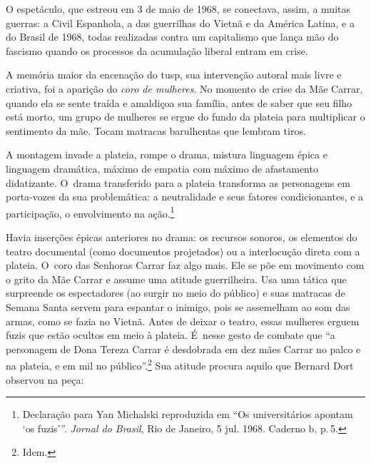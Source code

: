 O espetáculo, que estreou em 3 de maio de 1968, se conectava, assim, a muitas
guerras: a Civil Espanhola, a das guerrilhas do Vietnã e da América
Latina, e a do Brasil de 1968, todas realizadas contra um capitalismo
que lança mão do fascismo quando os processos da acumulação liberal
entram em crise.

\page

\subject{Coro das mulheres em armas}

A memória maior da encenação do {\sc tusp}, sua intervenção autoral mais livre
e criativa, foi a aparição do {\it coro de mulheres}. No momento de
crise da Mãe Carrar, quando ela se sente traída e amaldiçoa sua família,
antes de saber que seu filho está morto, um grupo de mulheres se ergue
do fundo da plateia para multiplicar o sentimento da mãe. Tocam matracas
barulhentas que lembram tiros.


\startblockquote
A montagem invade a plateia, rompe o drama, mistura linguagem épica e
linguagem dramática, máximo de empatia com máximo de afastamento
didatizante. O~drama transferido para a plateia transforma as
personagens em porta-vozes da sua problemática: a neutralidade e seus
fatores condicionantes, e a participação, o envolvimento na
ação.\footnote{Declaração para Yan Michalski reproduzida em “Os
  universitários apontam ‘os fuzis'”. {\it Jornal do Brasil}, Rio de
  Janeiro, 5 jul. 1968. Caderno {\sc b}, p.\,5.}
\stopblockquote

Havia inserções épicas anteriores no drama: os recursos sonoros, os
elementos do teatro documental (como documentos projetados) ou a
interlocução direta com a plateia. O~coro das Senhoras Carrar faz algo
mais. Ele se põe em movimento com o grito da Mãe Carrar e assume uma
atitude guerrilheira. Usa uma tática que surpreende os
espectadores (ao surgir no meio do público) e suas matracas de Semana
Santa servem para espantar o inimigo, pois se assemelham ao som das armas,
como se fazia no Vietnã. Antes de deixar o teatro, essas mulheres
erguem fuzis que estão ocultos em meio à plateia. É~nesse gesto de
combate que “a personagem de Dona Tereza Carrar é desdobrada em dez mães
Carrar no palco e na plateia, e em mil no público”.\footnote{Idem.} Sua
atitude procura aquilo que Bernard Dort observou na peça:

